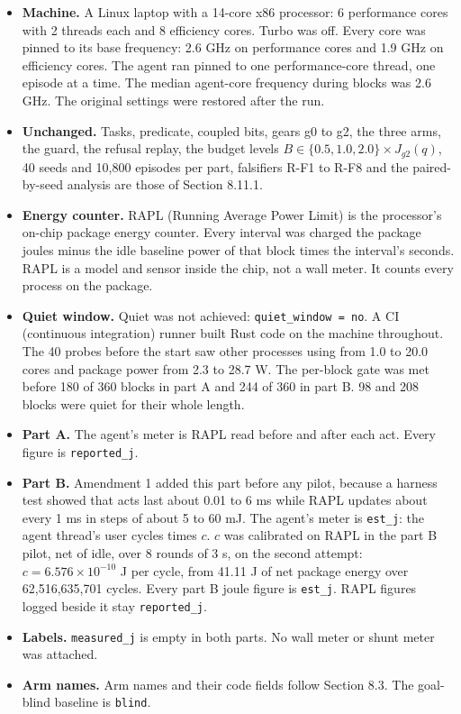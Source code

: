 \documentclass[
  10pt,
]{article}
\providecommand{\tightlist}{%
  \setlength{\itemsep}{0pt}\setlength{\parskip}{0pt}}
\begin{document}
\begin{itemize}
\tightlist
\item
  \textbf{Machine.} A Linux laptop with a 14-core x86 processor: 6
  performance cores with 2 threads each and 8 efficiency cores. Turbo
  was off. Every core was pinned to its base frequency: 2.6 GHz on
  performance cores and 1.9 GHz on efficiency cores. The agent ran
  pinned to one performance-core thread, one episode at a time. The
  median agent-core frequency during blocks was 2.6 GHz. The original
  settings were restored after the run.
\item
  \textbf{Unchanged.} Tasks, predicate, coupled bits, gears g0 to g2,
  the three arms, the guard, the refusal replay, the budget levels
  \(B \in \{0.5, 1.0, 2.0\} \times J_{g2}(q)\), 40 seeds and 10,800
  episodes per part, falsifiers R-F1 to R-F8 and the paired-by-seed
  analysis are those of Section 8.11.1.
\item
  \textbf{Energy counter.} RAPL (Running Average Power Limit) is the
  processor's on-chip package energy counter. Every interval was charged
  the package joules minus the idle baseline power of that block times
  the interval's seconds. RAPL is a model and sensor inside the chip,
  not a wall meter. It counts every process on the package.
\item
  \textbf{Quiet window.} Quiet was not achieved:
  \texttt{quiet\_window\ =\ no}. A CI (continuous integration) runner
  built Rust code on the machine throughout. The 40 probes before the
  start saw other processes using from 1.0 to 20.0 cores and package
  power from 2.3 to 28.7 W. The per-block gate was met before 180 of 360
  blocks in part A and 244 of 360 in part B. 98 and 208 blocks were
  quiet for their whole length.
\item
  \textbf{Part A.} The agent's meter is RAPL read before and after each
  act. Every figure is \texttt{reported\_j}.
\item
  \textbf{Part B.} Amendment 1 added this part before any pilot, because
  a harness test showed that acts last about 0.01 to 6 ms while RAPL
  updates about every 1 ms in steps of about 5 to 60 mJ. The agent's
  meter is \texttt{est\_j}: the agent thread's user cycles times \(c\).
  \(c\) was calibrated on RAPL in the part B pilot, net of idle, over 8
  rounds of 3 s, on the second attempt: \(c = 6.576 \times 10^{-10}\) J
  per cycle, from 41.11 J of net package energy over 62,516,635,701
  cycles. Every part B joule figure is \texttt{est\_j}. RAPL figures
  logged beside it stay \texttt{reported\_j}.
\item
  \textbf{Labels.} \texttt{measured\_j} is empty in both parts. No wall
  meter or shunt meter was attached.
\item
  \textbf{Arm names.} Arm names and their code fields follow Section
  8.3. The goal-blind baseline is \texttt{blind}.
\end{itemize}
\end{document}
